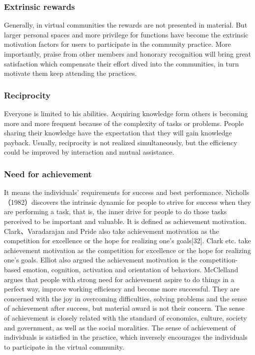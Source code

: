 \documentclass{elsarticle}
\begin{document}
\subsubsection{Extrinsic rewards}
\label{sec:extrinsic-rewards}


   Generally, in virtual communities the rewards are
  not presented in material. But larger personal spaces and more
  privilege for functions have become the extrinsic motivation factors
  for users to participate in the community practice.  More
  importantly,  praise from other members and
honorary recognition will bring great satisfaction which compensate
their effort dived into the communities, in turn motivate them keep
attending the practices\cite{Zhugea}.

\subsubsection{Reciprocity}
\label{sec:reciprocity}

Everyone is limited to his abilities. Acquiring knowledge form others
is becoming more and more frequent because of the complexity of tasks
or problems. People sharing their knowledge have the expectation that
they will gain knowledge payback.  Usually, reciprocity is not realized simultaneously, but the
efficiency could be improved by interaction and mutual assistance.

\subsubsection{Need for achievement}
\label{sec:need-achievement}


 It means the individuals’ requirements for
success and best performance. Nicholls（1982）discovers the intrinsic
dynamic for people to strive for success when they are performing a
task, that is, the inner drive for people to do those tasks perceived
to be important and valuable. It is defined as achievement
motivation. Clark、Varadarajan and Pride also take achievement
motivation as the competition for excellence or the hope for realizing
one’s goals[32]. Clark etc. take achievement motivation as the competition for
excellence or the hope for realizing one’s goals\cite{clark1994emc}. 
Elliot also argued  the achievement motivation is the
competition-based emotion, cognition, activation and orientation of
behaviors\cite{elliot1999aaa}.  McClelland argues that people
with strong need for achievement aspire to do things in a perfect way,
improve working efficiency and become more successful\cite{mcclelland1976am}. They are
concerned with the joy in overcoming difficulties, solving problems
and the sense of achievement after success, but material award is not
their concern. The sense of achievement is closely related with the
standard of economics, culture, society and government, as well as the
social moralities. The sense of achievement of individuals is
satisfied in the practice, which inversely encourages the individuals
to participate in the virtual community. 
\end{document}

